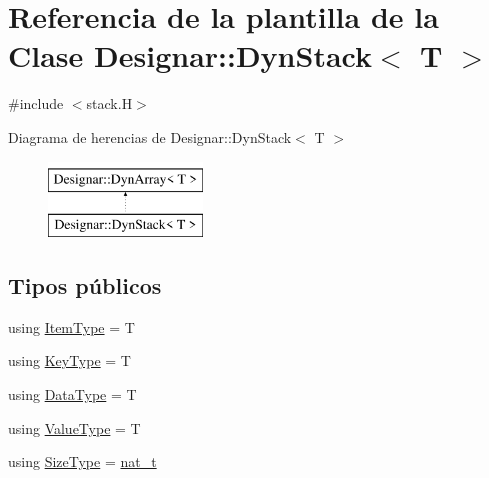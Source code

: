 \hypertarget{class_designar_1_1_dyn_stack}{}\section{Referencia de la plantilla de la Clase Designar\+:\+:Dyn\+Stack$<$ T $>$}
\label{class_designar_1_1_dyn_stack}


{\ttfamily \#include $<$stack.\+H$>$}

Diagrama de herencias de Designar\+:\+:Dyn\+Stack$<$ T $>$\begin{figure}[H]
\begin{center}
\leavevmode
\includegraphics[height=2.000000cm]{class_designar_1_1_dyn_stack}
\end{center}
\end{figure}
\subsection*{Tipos públicos}
\begin{DoxyCompactItemize}
\item 
using \hyperlink{class_designar_1_1_dyn_stack_a2e50015faeef3234802046097db79f73}{Item\+Type} = T
\item 
using \hyperlink{class_designar_1_1_dyn_stack_a4a4fd39e08b25a05641fb888b99261c8}{Key\+Type} = T
\item 
using \hyperlink{class_designar_1_1_dyn_stack_afb7dc9ebd5c844450d997e38b195f3bb}{Data\+Type} = T
\item 
using \hyperlink{class_designar_1_1_dyn_stack_a511da1dd717eb6f9c5b143b2a8543176}{Value\+Type} = T
\item 
using \hyperlink{class_designar_1_1_dyn_stack_adb2c839a5bc34354be458c86dd35f5b8}{Size\+Type} = \hyperlink{namespace_designar_aa72662848b9f4815e7bf31a7cf3e33d1}{nat\+\_\+t}
\end{DoxyCompactItemize}
